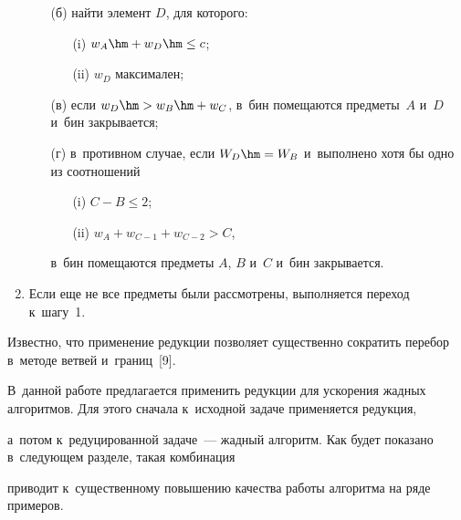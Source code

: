 \begin{enumerate}[1.]
\begin{itemize}
        \item[(б)] найти элемент $D$, для которого:

        \begin{itemize}

            \item[(i)] $w_A \hm+ w_D \hm\leq c$;

            \item[(ii)] $w_D$ максимален;

                    \end{itemize}

        \item[(в)] если $w_D \hm> w_B\hm +  w_C$, в~бин помещаются предметы~$A$ и~$D$ и~бин закрывается;

        \item[(г)] в~противном случае, если $W_D \hm= W_B$ и~выполнено хотя бы одно из соотношений

        \begin{itemize}

            \item[(i)] $C-B \leq 2$;

            \item[(ii)] $w_A+ w_{C-1} + w_{C-2} > C$,

        \end{itemize}

        в~бин помещаются предметы  $A$, $B$ и~$C$ и~бин закрывается.

    \end{itemize}

    \item Если еще не все предметы были рассмотрены, выполняется переход к~шагу~1.

\end{enumerate}



Известно, что применение редукции поз\-во\-ля\-ет существенно сократить перебор в~методе ветвей и~границ~[9]. 

В~данной работе предлагается применить редукции для уско\-ре\-ния жад\-ных алгоритмов. Для этого сначала к~исходной задаче применяется редукция, 

а~потом к~редуцированной задаче~--- жад\-ный алгоритм. Как будет показано в~сле\-ду\-ющем разделе, такая комбинация  

приводит к~существенному повышению качества работы алгоритма на ряде при\-меров.



